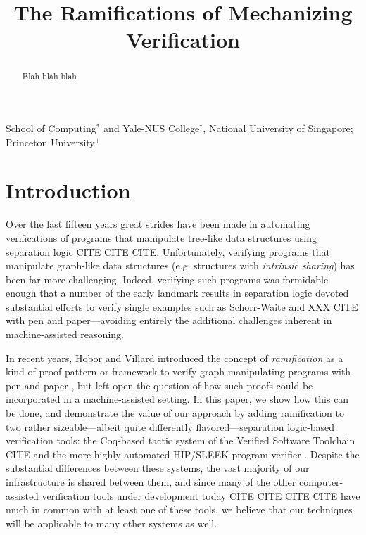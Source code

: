 \documentclass[pldi]{sigplanconf-pldi15}
\begin{document}
%
%

\title{The Ramifications of Mechanizing Verification}
{}
{School of Computing$^{*}$ and Yale-NUS College$^{\dagger}$, National University of Singapore; Princeton University$^{+}$}

\maketitle
\begin{abstract}
Blah blah blah
\end{abstract}

\newcommand\hide[1]{}

\section{Introduction}
Over the last fifteen years great strides have been made in automating verifications of programs that manipulate
tree-like data structures using separation logic CITE CITE CITE.  Unfortunately, verifying programs that manipulate 
graph-like data structures (e.g. structures with \emph{intrinsic sharing}) has been far more challenging.
Indeed, verifying such programs was formidable enough that a number of the early landmark results in separation logic
devoted substantial efforts to verify single examples such as Schorr-Waite \cite{hongseok:phd} and XXX CITE with pen and 
paper---avoiding entirely the additional challenges inherent in machine-assisted reasoning.

In recent years, Hobor and Villard introduced the concept of \emph{ramification} as a kind of proof pattern or framework
to verify graph-manipulating programs with pen and paper \cite{hobor:ramification}, but left open the question of how such proofs could
be incorporated in a machine-assisted setting.  In this paper, we show how this can be done, and demonstrate the
value of our approach by adding ramification to two rather sizeable---albeit quite differently flavored---separation logic-based 
verification tools: the Coq-based tactic system of the Verified Software Toolchain CITE and the more highly-automated HIP/SLEEK
program verifier \cite{chin:hipsleek}.  Despite the substantial differences between these systems, the vast majority of our infrastructure is 
shared between them, and since many of the other computer-assisted verification tools under development 
today CITE CITE CITE CITE have much in common with at least one of these tools, we believe that our techniques will be 
applicable to many other systems as well.
\end{document}
